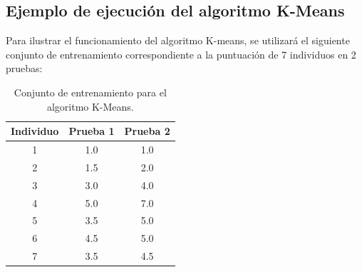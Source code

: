\subsection{Ejemplo de ejecución del algoritmo K-Means}
Para ilustrar el funcionamiento del algoritmo K-means, se utilizará el siguiente conjunto de entrenamiento correspondiente a la puntuación de 7 individuos en 2 pruebas:

\begin{table}[H]
	\begin{center}
		\label{tab:conjuntoKMeans}
		\begin{tabular}{c|c|c}
			\textbf{Individuo} & \textbf{Prueba 1} & \textbf{Prueba 2}\\
			\hline
			1 & 1.0 & 1.0\\
			2 & 1.5 & 2.0\\
			3 & 3.0 & 4.0\\
			4 & 5.0 & 7.0\\
			5 & 3.5 & 5.0\\
			6 & 4.5 & 5.0\\
			7 & 3.5 & 4.5\\
		\end{tabular}
	\end{center}
	\caption{Conjunto de entrenamiento para el algoritmo K-Means.}
\end{table}

